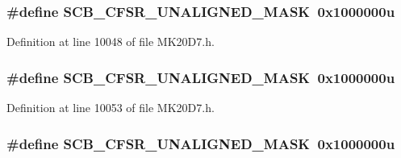 \subsubsection[{\texorpdfstring{S\+C\+B\+\_\+\+C\+F\+S\+R\+\_\+\+U\+N\+A\+L\+I\+G\+N\+E\+D\+\_\+\+M\+A\+SK}{SCB_CFSR_UNALIGNED_MASK}}]{\setlength{\rightskip}{0pt plus 5cm}\#define S\+C\+B\+\_\+\+C\+F\+S\+R\+\_\+\+U\+N\+A\+L\+I\+G\+N\+E\+D\+\_\+\+M\+A\+SK~0x1000000u}\hypertarget{group___s_c_b___register___masks_ga8a4e7a6f895fa22ee626cf57cf4a5531}{}\label{group___s_c_b___register___masks_ga8a4e7a6f895fa22ee626cf57cf4a5531}


Definition at line 10048 of file M\+K20\+D7.\+h.

\subsubsection[{\texorpdfstring{S\+C\+B\+\_\+\+C\+F\+S\+R\+\_\+\+U\+N\+A\+L\+I\+G\+N\+E\+D\+\_\+\+M\+A\+SK}{SCB_CFSR_UNALIGNED_MASK}}]{\setlength{\rightskip}{0pt plus 5cm}\#define S\+C\+B\+\_\+\+C\+F\+S\+R\+\_\+\+U\+N\+A\+L\+I\+G\+N\+E\+D\+\_\+\+M\+A\+SK~0x1000000u}\hypertarget{group___s_c_b___register___masks_ga8a4e7a6f895fa22ee626cf57cf4a5531}{}\label{group___s_c_b___register___masks_ga8a4e7a6f895fa22ee626cf57cf4a5531}


Definition at line 10053 of file M\+K20\+D7.\+h.

\subsubsection[{\texorpdfstring{S\+C\+B\+\_\+\+C\+F\+S\+R\+\_\+\+U\+N\+A\+L\+I\+G\+N\+E\+D\+\_\+\+M\+A\+SK}{SCB_CFSR_UNALIGNED_MASK}}]{\setlength{\rightskip}{0pt plus 5cm}\#define S\+C\+B\+\_\+\+C\+F\+S\+R\+\_\+\+U\+N\+A\+L\+I\+G\+N\+E\+D\+\_\+\+M\+A\+SK~0x1000000u}\hypertarget{group___s_c_b___register___masks_ga8a4e7a6f895fa22ee626cf57cf4a5531}{}\label{group___s_c_b___register___masks_ga8a4e7a6f895fa22ee626cf57cf4a5531}


